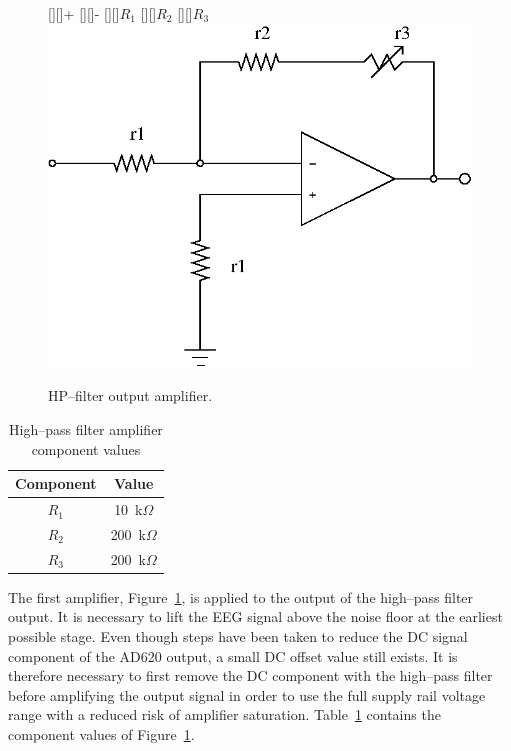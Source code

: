 \begin{figure}[htbp]
\begin{center}
	\psfrag{+}[][]{+}
	\psfrag{-}[][]{-}  
	[][]{$R_1$} 
	[][]{$R_2$}
	[][]{$R_3$}  
	\includegraphics*{amp1.eps}
	\caption{HP--filter output amplifier.}
\label{fig:hp-amp}
\end{center}
\end{figure}

\begin{table}
\begin{center}	
	\begin{tabular}[htpb]{|c|c|} \hline
	Component & Value \\ \hline
	$R_1$ & 10~k$\Omega$ \\
	$R_2$ & 200~k$\Omega$ \\
	$R_3$ & 200~k$\Omega$ \\
	\hline
	\end{tabular}
	\caption{High--pass filter amplifier component values}
	\label{table:hp-amp}
\end{center}	
\end{table}

The first amplifier, Figure~\ref{fig:hp-amp}, is applied to the output
of the high--pass filter output. It is necessary to lift the EEG
signal above the noise floor at the earliest possible stage. Even
though steps have been taken to reduce the DC signal component of the
AD620 output, a small DC offset value still exists. It is therefore
necessary to first remove the DC component with the high--pass filter
before amplifying the output signal in order to use the full supply
rail voltage range with a reduced risk of amplifier
saturation. Table~\ref{table:hp-amp} contains the component values of
Figure~\ref{fig:hp-amp}.


